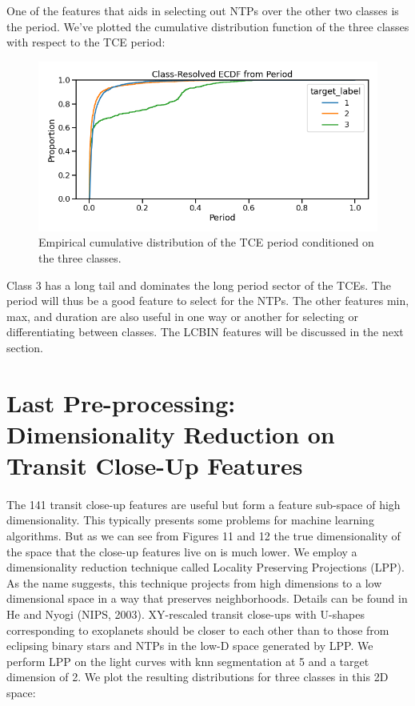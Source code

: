 \documentclass{article}
\begin{document}
One of the features that aids in selecting out NTPs over the other two classes is the period. We've plotted the cumulative distribution function of the three classes with respect to the TCE period: 
  \begin{figure}[H]
	\begin{center}
		\includegraphics[totalheight=4cm]{figures/ecdf_period.png}
	\end{center}
	\caption{Empirical cumulative distribution of the TCE period conditioned on the three classes. }
\end{figure}
Class 3 has a long tail and dominates the long period sector of the TCEs. The period will thus be a good feature to select for the NTPs. The other features min, max, and duration are also useful in one way or another for selecting or differentiating between classes. The LCBIN features will be discussed in the next section.
\section{Last Pre-processing: Dimensionality Reduction on Transit Close-Up Features}
\paragraph{} The 141 transit close-up features are useful but form a feature sub-space of high dimensionality. This typically presents some problems for machine learning algorithms. But as we can see from Figures 11 and 12 the true dimensionality of the space that the close-up features live on is much lower. We employ a dimensionality reduction technique called Locality Preserving Projections (LPP). As the name suggests, this technique projects from high dimensions to a low dimensional space in a way that preserves neighborhoods. Details can be found in He and Nyogi (NIPS, 2003). XY-rescaled transit close-ups with U-shapes corresponding to exoplanets should be closer to each other than to those from eclipsing binary stars and NTPs in the low-D space generated by LPP. We perform LPP on the light curves with knn segmentation at 5 and a target dimension of 2. We plot the resulting distributions for three classes in this 2D space:
\end{document}
